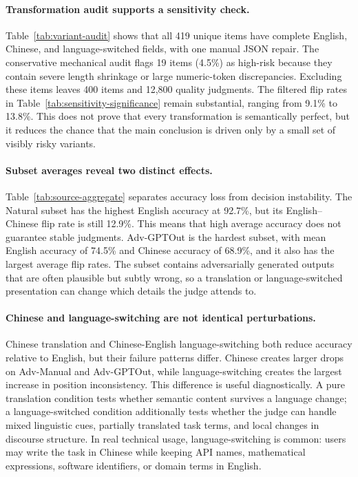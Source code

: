 \documentclass[10pt,twocolumn]{article}
\begin{document}
\paragraph{Transformation audit supports a sensitivity check.}
Table~\ref{tab:variant-audit} shows that all 419 unique items have complete English, Chinese, and language-switched fields, with one manual JSON repair. The conservative mechanical audit flags 19 items (4.5\%) as high-risk because they contain severe length shrinkage or large numeric-token discrepancies. Excluding these items leaves 400 items and 12,800 quality judgments. The filtered flip rates in Table~\ref{tab:sensitivity-significance} remain substantial, ranging from 9.1\% to 13.8\%. This does not prove that every transformation is semantically perfect, but it reduces the chance that the main conclusion is driven only by a small set of visibly risky variants.

\paragraph{Subset averages reveal two distinct effects.}
Table~\ref{tab:source-aggregate} separates accuracy loss from decision instability. The Natural subset has the highest English accuracy at 92.7\%, but its English--Chinese flip rate is still 12.9\%. This means that high average accuracy does not guarantee stable judgments. Adv-GPTOut is the hardest subset, with mean English accuracy of 74.5\% and Chinese accuracy of 68.9\%, and it also has the largest average flip rates. The subset contains adversarially generated outputs that are often plausible but subtly wrong, so a translation or language-switched presentation can change which details the judge attends to.

\paragraph{Chinese and language-switching are not identical perturbations.}
Chinese translation and Chinese-English language-switching both reduce accuracy relative to English, but their failure patterns differ. Chinese creates larger drops on Adv-Manual and Adv-GPTOut, while language-switching creates the largest increase in position inconsistency. This difference is useful diagnostically. A pure translation condition tests whether semantic content survives a language change; a language-switched condition additionally tests whether the judge can handle mixed linguistic cues, partially translated task terms, and local changes in discourse structure. In real technical usage, language-switching is common: users may write the task in Chinese while keeping API names, mathematical expressions, software identifiers, or domain terms in English.
\end{document}
